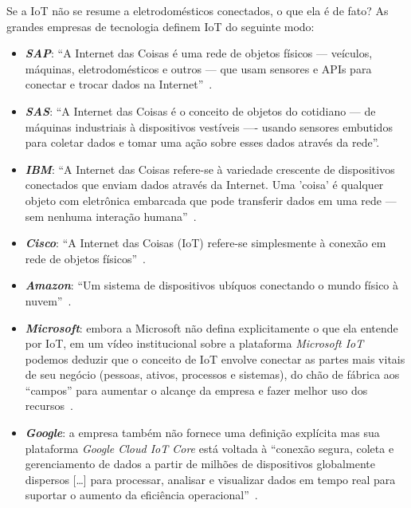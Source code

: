 \documentclass[pdftex, brazil, 12pt, twoside]{article}
\begin{document}
Se a IoT não se resume a eletrodomésticos conectados, o que ela é de fato? As
grandes empresas de tecnologia definem IoT do seguinte modo:

\begin{itemize}
\item \emph{\textbf{SAP}}: ``A Internet das Coisas é uma rede de objetos físicos --- veículos,
  máquinas, eletrodomésticos e outros --- que usam sensores e APIs para conectar e
  trocar dados na Internet''~\citep{SAPWhatIoT}.
\item \emph{\textbf{SAS}}: ``A Internet das Coisas é o conceito de objetos do cotidiano --- de
  máquinas industriais à dispositivos vestíveis ---- usando sensores embutidos para coletar
  dados e tomar uma ação sobre esses dados através da rede''\citep{SASWhatIoT}.
\item \emph{\textbf{IBM}}: ``A Internet das Coisas refere-se à variedade crescente
  de dispositivos conectados que enviam dados através da Internet. Uma 'coisa' é qualquer
  objeto com eletrônica embarcada que pode transferir dados em uma rede --- sem nenhuma
  interação humana''~\citep{IBMWhatIsIoT,IBMWhatsonIoT}.
\item \emph{\textbf{Cisco}}: ``A Internet das Coisas (IoT) refere-se simplesmente à conexão
  em rede de objetos físicos''~\citep{CiscoIoTVS2013}.
\item \emph{\textbf{Amazon}}: ``Um sistema de dispositivos ubíquos conectando o mundo
  físico à nuvem''~\citep{AmazonIoT}.
\item \emph{\textbf{Microsoft}}: embora a Microsoft não defina explicitamente o que
  ela entende por IoT, em um vídeo institucional sobre a plataforma \emph{Microsoft IoT}
  podemos deduzir que o conceito de IoT envolve conectar as partes mais vitais de
  seu negócio (pessoas, ativos, processos e sistemas), do chão de fábrica aos ``campos''
  para aumentar o alcançe da empresa e fazer melhor uso dos recursos~\citep{MicrosoftIoT}.
\item \emph{\textbf{Google}}: a empresa também não fornece uma definição explícita mas
  sua plataforma \emph{Google Cloud IoT Core} está voltada à ``conexão segura, coleta e
  gerenciamento de dados a partir de milhões de dispositivos globalmente dispersos [\ldots]
  para processar, analisar e visualizar dados em tempo real para suportar o aumento
  da eficiência operacional''~\citep{GoogleWhatsIoT}.
\end{itemize}
\end{document}
